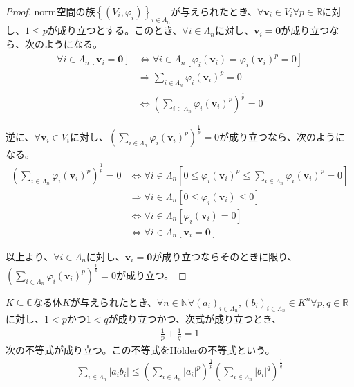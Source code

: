 \documentclass[dvipdfmx]{jsarticle}
\begin{document}
\begin{proof}
norm空間の族$\left\{ \left( V_{i},\varphi_{i} \right) \right\}_{i \in \varLambda_{n}}$が与えられたとき、$\forall\mathbf{v}_{i} \in V_{i}\forall p \in \mathbb{R}$に対し、$1 \leq p$が成り立つとする。このとき、$\forall i \in \varLambda_{n}$に対し、$\mathbf{v}_{i} = \mathbf{0}$が成り立つなら、次のようになる。
\begin{align*}
\forall i \in \varLambda_{n}\left[ \mathbf{v}_{i} = \mathbf{0} \right] &\Leftrightarrow \forall i \in \varLambda_{n}\left[ \varphi_{i}\left( \mathbf{v}_{i} \right) = {\varphi_{i}\left( \mathbf{v}_{i} \right)}^{p} = 0 \right]\\
&\Rightarrow \sum_{i \in \varLambda_{n}} {\varphi_{i}\left( \mathbf{v}_{i} \right)}^{p} = 0\\
&\Leftrightarrow \left( \sum_{i \in \varLambda_{n}} {\varphi_{i}\left( \mathbf{v}_{i} \right)}^{p} \right)^{\frac{1}{p}} = 0
\end{align*}\par
逆に、$\forall\mathbf{v}_{i} \in V_{i}$に対し、$\left( \sum_{i \in \varLambda_{n}} {\varphi_{i}\left( \mathbf{v}_{i} \right)}^{p} \right)^{\frac{1}{p}} = 0$が成り立つなら、次のようになる。
\begin{align*}
\left( \sum_{i \in \varLambda_{n}} {\varphi_{i}\left( \mathbf{v}_{i} \right)}^{p} \right)^{\frac{1}{p}} = 0 &\Leftrightarrow \forall i \in \varLambda_{n}\left[ 0 \leq {\varphi_{i}\left( \mathbf{v}_{i} \right)}^{p} \leq \sum_{i \in \varLambda_{n}} {\varphi_{i}\left( \mathbf{v}_{i} \right)}^{p} = 0 \right]\\
&\Rightarrow \forall i \in \varLambda_{n}\left[ 0 \leq \varphi_{i}\left( \mathbf{v}_{i} \right) \leq 0 \right]\\
&\Leftrightarrow \forall i \in \varLambda_{n}\left[ \varphi_{i}\left( \mathbf{v}_{i} \right) = 0 \right]\\
&\Leftrightarrow \forall i \in \varLambda_{n}\left[ \mathbf{v}_{i} = \mathbf{0} \right]
\end{align*}\par
以上より、$\forall i \in \varLambda_{n}$に対し、$\mathbf{v}_{i} = \mathbf{0}$が成り立つならそのときに限り、$\left( \sum_{i \in \varLambda_{n}} {\varphi_{i}\left( \mathbf{v}_{i} \right)}^{p} \right)^{\frac{1}{p}} = 0$が成り立つ。
\end{proof}
\begin{thm}[Hölderの不等式]\label{2.3.1.8}
$K \subseteq \mathbb{C}$なる体$K$が与えられたとき、$\forall n \in \mathbb{N}\forall\left( a_{i} \right)_{i \in \varLambda_{n}},\left( b_{i} \right)_{i \in \varLambda_{n}} \in K^{n}\forall p,q \in \mathbb{R}$に対し、$1 < p$かつ$1 < q$が成り立つかつ、次式が成り立つとき、
\begin{align*}
\frac{1}{p} + \frac{1}{q} = 1
\end{align*}
次の不等式が成り立つ。この不等式をHölderの不等式という。
\begin{align*}
\sum_{i \in \varLambda_{n}} \left| a_{i}b_{i} \right| \leq \left( \sum_{i \in \varLambda_{n}} \left| a_{i} \right|^{p} \right)^{\frac{1}{p}}\left( \sum_{i \in \varLambda_{n}} \left| b_{i} \right|^{q} \right)^{\frac{1}{q}}
\end{align*}
\end{thm}
\end{document}
